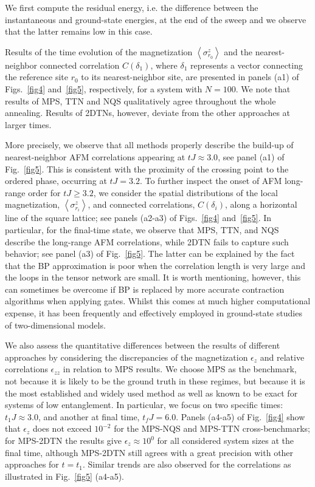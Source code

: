 \documentclass[aps,pra,reprint,amssymb,superscriptaddress]{revtex4-2}
\begin{document}
We first compute the residual energy, i.e. the difference between the instantaneous and ground-state energies, at the end of the sweep and we observe that the latter remains low in this case.

Results of the time evolution of the magnetization $\left< \sigma^z_{r_0} \right>$ and the nearest-neighbor connected correlation $C(\delta_1)$, where $\delta_1$ represents a vector connecting the reference site $r_0$ to its nearest-neighbor site,
are presented in  panels (a1) of Figs.~\ref{fig4} and~\ref{fig5}, respectively, for a system with $N = 100$.
We note that results of MPS, TTN and NQS qualitatively agree throughout the whole annealing. Results of  2DTNs, however, deviate from the other approaches at larger times. 

More precisely, we observe that all methods properly describe the build-up of nearest-neighbor AFM correlations appearing at $tJ \approx 3.0$, see panel (a1) of Fig.~\ref{fig5}. This is consistent with the proximity of the crossing point to the ordered phase, occurring at $tJ = 3.2$. To further inspect the onset of AFM long-range order for $tJ \ge 3.2$, we consider the spatial distributions of the local magnetization, $\left< \sigma^z_{r_i} \right>$, and connected correlations, $C(\delta_i)$, along a horizontal line of the square lattice; see panels (a2-a3) of Figs.~\ref{fig4} and~\ref{fig5}. In particular, for the final-time state, we observe that MPS, TTN, and NQS describe the long-range AFM correlations, while 2DTN fails to capture such behavior; see panel (a3) of Fig.~\ref{fig5}. The latter can be explained by the fact that the BP approximation is poor when the correlation length is very large and the loops in the tensor network are small. It is worth mentioning, however, this can sometimes be overcome if BP is replaced by more accurate contraction algorithms when applying gates. Whilst this comes at much higher computational expense, it has been frequently and effectively employed in ground-state studies~\cite{jordan_classical_2008, yang_efficient_2025} of two-dimensional models.


We also assess the quantitative differences between the results of different approaches by considering the discrepancies of the magnetization 
$\epsilon_z$ and relative correlations $\epsilon_{zz}$ in relation to MPS results. We choose MPS as the benchmark, not because it is likely to be the ground truth in these regimes, but because it is the most established and widely used method as well as known to be exact for systems of low entanglement. In particular, we focus on 
two specific times:  $t_1J \approx 3.0$, and another at final time, $t_fJ = 6.0$.
Panels (a4-a5) of Fig.~\ref{fig4} show that $\epsilon_z$ does not exceed $10^{-2}$ for the MPS-NQS and MPS-TTN cross-benchmarks; for  MPS-2DTN the results give $\epsilon_z \approx 10^{0}$ for all considered system sizes  at the final time, although MPS-2DTN still agrees with a great precision with other approaches for $t=t_1$. Similar trends are also observed for the correlations as illustrated in Fig.~\ref{fig5} (a4-a5).
\end{document}
